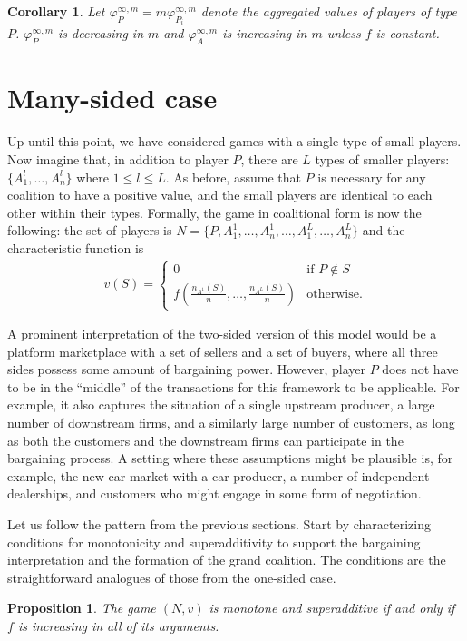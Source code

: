 \documentclass[a4paper]{article}
\newtheorem{proposition}{Proposition}
\newtheorem{corollary}{Corollary}
\begin{document}
\begin{corollary}
    \label{cor:multiple_platforms_2}
    Let $\varphi_{P}^{\infty, m} = m\varphi_{P_i}^{\infty, m}$ denote the aggregated values of players of type $P$. $\varphi_{P}^{\infty, m}$ is decreasing in $m$ and $\varphi_{A}^{\infty, m}$ is increasing in $m$ unless $f$ is constant.
\end{corollary}


\section{Many-sided case}

Up until this point, we have considered games with a single type of small players.
Now imagine that, in addition to player $P$, there are $L$ types of smaller players: $\{A^l_1, \dots, A^l_n\}$ where $1 \leq l \leq L$.
As before, assume that $P$ is necessary for any coalition to have a positive value, and the small players are identical to each other within their types.
Formally, the game in coalitional form is now the following: the set of players is $N = \{P, A^1_1, \dots, A^1_n, \dots, A^L_1, \dots, A^L_n\}$ and the characteristic function is
\begin{align*}
    v(S) = \begin{cases}
        0                                                & \text{if } P \notin S \\
        f\left(\frac{n_{A^1}(S)}{n}, \dots, \frac{n_{A^L}(S)}{n}\right) & \text{otherwise}.
    \end{cases}
\end{align*}

A prominent interpretation of the two-sided version of this model would be a platform marketplace with a set of sellers and a set of buyers, where all three sides possess some amount of bargaining power.
However, player $P$ does not have to be in the ``middle'' of the transactions for this framework to be applicable.
For example, it also captures the situation of a single upstream producer, a large number of downstream firms, and a similarly large number of customers, as long as both the customers and the downstream firms can participate in the bargaining process.
A setting where these assumptions might be plausible is, for example, the new car market with a car producer, a number of independent dealerships, and customers who might engage in some form of negotiation.

Let us follow the pattern from the previous sections.
Start by characterizing conditions for monotonicity and superadditivity to support the bargaining interpretation and the formation of the grand coalition.
The conditions are the straightforward analogues of those from the one-sided case.
\begin{proposition}
    The game $(N, v)$ is monotone and superadditive if and only if $f$ is increasing in all of its arguments.
\end{proposition}
\end{document}
